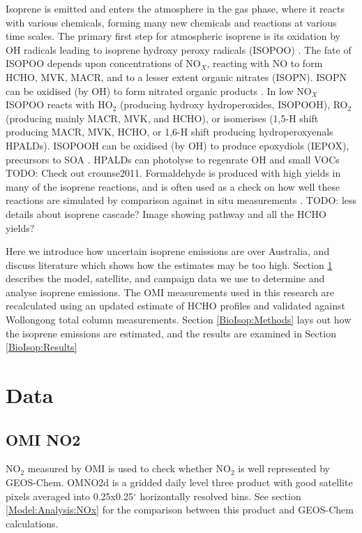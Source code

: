   Isoprene is emitted and enters the atmosphere in the gas phase, where it reacts with various chemicals, forming many new chemicals and reactions at various time scales.
  The primary first step for atmospheric isoprene is its oxidation by OH radicals leading to isoprene hydroxy peroxy radicals (ISOPOO) \citep{Wolfe2016,Marvin2017}.
  The fate of ISOPOO depends upon concentrations of NO$_X$, reacting with NO to form HCHO, MVK, MACR, and to a lesser extent organic nitrates (ISOPN).
  ISOPN can be oxidised (by OH) to form nitrated organic products \citep{Paulot2009a}.
  In low NO$_X$ ISOPOO reacts with HO$_2$ (producing hydroxy hydroperoxides, ISOPOOH), RO$_2$ (producing mainly MACR, MVK, and HCHO), or isomerises (1,5-H shift producing MACR, MVK, HCHO, or 1,6-H shift producing hydroperoxyenals HPALDs). 
  ISOPOOH can be oxidised (by OH) to produce epoxydiols (IEPOX), precursors to SOA \citep{Paulot2009b}. 
  HPALDs can photolyse to regenrate OH and small VOCs \citep{Crounse2011, Wolfe2012, Peeters2014} TODO: Check out crounse2011.
  Formaldehyde is produced with high yields in many of the isoprene reactions, and is often used as a check on how well these reactions are simulated by comparison against in situ measurements \citep{Marvin2017}.
  TODO: less details about isoprene cascade? Image showing pathway and all the HCHO yields?
  
  Here we introduce how uncertain isoprene emissions are over Australia, and discuss literature which shows how the estimates may be too high.
  Section \ref{BioIsop:Data} describes the model, satellite, and campaign data we use to determine and analyse isoprene emissions.
  The OMI measurements used in this research are recalculated using an updated estimate of HCHO profiles and validated against Wollongong total column measurements.
  Section \ref{BioIsop:Methods} lays out how the isoprene emissions are estimated, and the results are examined in Section \ref{BioIsop:Results}
  
\section{Data}
  \label{BioIsop:Data}  
  
  \subsection{OMI NO2}
    NO$_2$ measured by OMI is used to check whether NO$_2$ is well represented by GEOS-Chem. 
    OMNO2d is a gridded daily level three product with good satellite pixels averaged into 0.25x0.25$^{\circ}$ horizontally resolved bins.
    See section \ref{Model:Analysis:NOx} for the comparison between this product and GEOS-Chem calculations.
  
